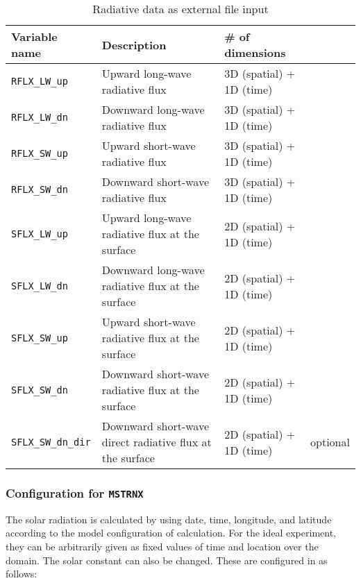 \begin{table}[h]
\begin{center}
  \caption{Radiative data as external file input}
  \label{tab:var_list_atm_rd_offline}
  \begin{tabularx}{150mm}{lXll} \hline
    \rowcolor[gray]{0.9}  Variable name & Description & \# of dimensions & \\ \hline
      \verb|RFLX_LW_up|     & Upward long-wave radiative flux & 3D (spatial) + 1D (time) \\
      \verb|RFLX_LW_dn|     & Downward long-wave radiative flux & 3D (spatial) + 1D (time) \\
      \verb|RFLX_SW_up|     & Upward short-wave radiative flux & 3D (spatial) + 1D (time) \\
      \verb|RFLX_SW_dn|     & Downward short-wave radiative flux & 3D (spatial) + 1D (time) \\
      \verb|SFLX_LW_up|     & Upward long-wave radiative flux at the surface & 2D (spatial) + 1D (time) \\
      \verb|SFLX_LW_dn|     & Downward long-wave radiative flux at the surface & 2D (spatial) + 1D (time) \\
      \verb|SFLX_SW_up|     & Upward short-wave radiative flux at the surface & 2D (spatial) + 1D (time) \\
      \verb|SFLX_SW_dn|     & Downward short-wave radiative flux at the surface & 2D (spatial) + 1D (time) \\
      \verb|SFLX_SW_dn_dir| & Downward short-wave direct radiative flux at the surface & 2D (spatial) + 1D (time) & optional \\
    \hline
  \end{tabularx}
\end{center}
\end{table}

\subsubsection{Configuration for \texttt{MSTRNX}}

The solar radiation is calculated by using date, time, longitude, and latitude according to the model configuration of calculation.
For the ideal experiment, they can be arbitrarily given as fixed values of time and location over the domain.
The solar constant can also be changed. These are configured in  as follows:

